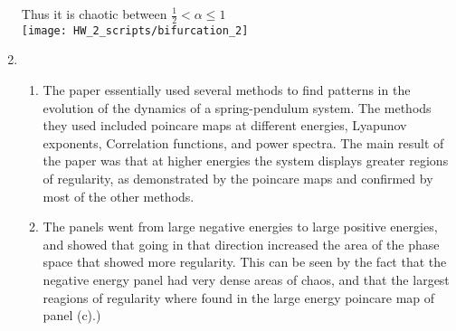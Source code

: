 \documentclass[12pt]{article}
\begin{document}
\begin{enumerate}
        Thus it is chaotic between $\frac{1}{2}<\alpha\leq1$\\
        \texttt{[image: HW\_2\_scripts/bifurcation\_2]}
        \item
        \begin{enumerate}
            \item The paper essentially used several methods to find patterns in the evolution of the dynamics of a spring-pendulum system.
            The methods they used included poincare maps at different energies, Lyapunov exponents, Correlation functions, and power spectra.
            The main result of the paper was that at higher energies the system displays greater regions of regularity, as demonstrated by the poincare maps and confirmed by most of the other methods.
            \item The panels went from large negative energies to large positive energies, and showed that going in that direction increased the area of the phase space that showed more regularity.
            This can be seen by the fact that the negative energy panel had very dense areas of chaos, and that the largest reagions of regularity where found in the large energy poincare map of panel (c).)
        \end{enumerate}
    \end{enumerate}
\end{document}
